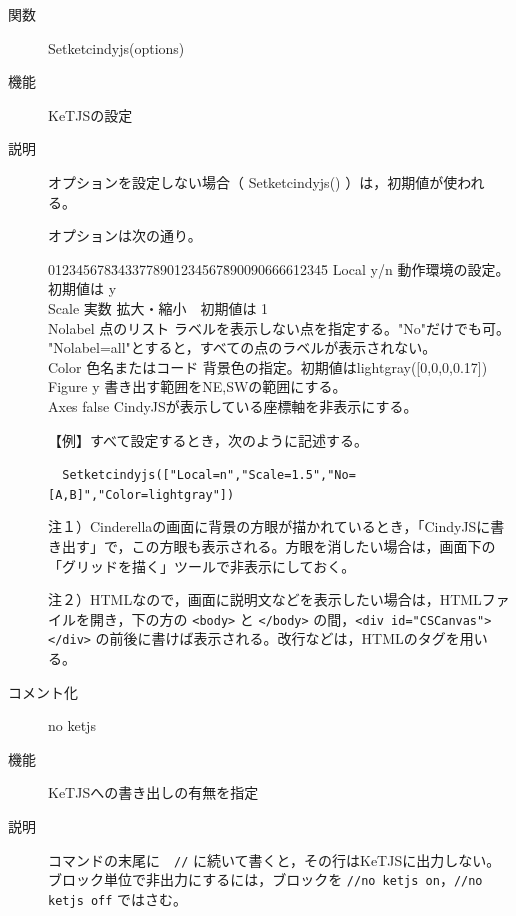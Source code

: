 \documentclass[papersize,a4paper,12pt,uplatex]{jsarticle}
\begin{document}
\begin{description}

\hypertarget{setketcindyjs}{}
\item[関数]Setketcindyjs(options)
\item[機能] KeTJSの設定
\item[説明] オプションを設定しない場合（ Setketcindyjs() ）は，初期値が使われる。

オプションは次の通り。

\begin{tabbing}
012345678\=3433778901234567\=890090666612345\=\kill
Local \> y/n \>動作環境の設定。 \>初期値は y\\
Scale \> 実数 \> 拡大・縮小　\>初期値は 1\\
Nolabel \> 点のリスト \> ラベルを表示しない点を指定する。"No"だけでも可。\\
\hspace*{10mm}"Nolabel=all"とすると，すべての点のラベルが表示されない。\\
Color \>  色名またはコード\> 背景色の指定。初期値はlightgray([0,0,0,0.17])\\
Figure \> y \>書き出す範囲をNE,SWの範囲にする。\\
Axes \> false \>CindyJSが表示している座標軸を非表示にする。 \\
\end{tabbing}
【例】すべて設定するとき，次のように記述する。

\verb|  Setketcindyjs(["Local=n","Scale=1.5","No=[A,B]","Color=lightgray"]) |

\vspace{\baselineskip}
注１）Cinderellaの画面に背景の方眼が描かれているとき，「CindyJSに書き出す」で，この方眼も表示される。方眼を消したい場合は，画面下の「グリッドを描く」ツールで非表示にしておく。

注２）HTMLなので，画面に説明文などを表示したい場合は，HTMLファイルを開き，下の方の \verb|<body>| と \verb|</body>| の間，\verb|<div id="CSCanvas"></div>| の前後に書けば表示される。改行などは，HTMLのタグを用いる。

\vspace{\baselineskip}
\hypertarget{setketcindy}{}
\item[コメント化] no ketjs
\item[機能] KeTJSへの書き出しの有無を指定
\item[説明] コマンドの末尾に　\verb|//| に続いて書くと，その行はKeTJSに出力しない。
ブロック単位で非出力にするには，ブロックを \verb|//no ketjs on|，\verb|//no ketjs off| ではさむ。


\end{description}
\end{document}
